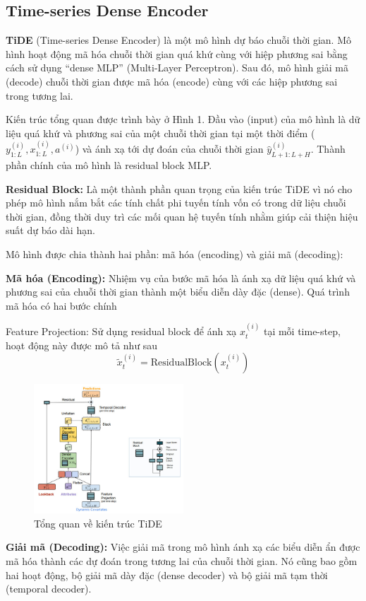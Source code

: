 \subsection{Time-series Dense Encoder}
\textbf{TiDE} (Time-series Dense Encoder) là một mô hình dự báo chuỗi thời gian. Mô hình hoạt động mã hóa chuỗi thời gian quá khứ cùng với hiệp phương sai bằng cách sử dụng “dense MLP” (Multi-Layer Perceptron). Sau đó, mô hình giải mã (decode) chuỗi thời gian được mã hóa (encode) cùng với các hiệp phương sai trong tương lai.

Kiến trúc tổng quan được trình bày ở Hình 1. Đầu vào (input) của mô hình là dữ liệu quá khứ và phương sai của một chuỗi thời gian tại một thời điểm ($y_{1:L}^{(i)}, x_{1:L}^{(i)}, a^{(i)}$) và ánh xạ tới dự đoán của chuỗi thời gian $\hat{y}_{L+1:L+H}^{(i)}$. Thành phần chính của mô hình là residual block MLP.

\textbf{Residual Block:} Là một thành phần quan trọng của kiến trúc TiDE vì nó cho phép mô hình nắm bắt các tính chất phi tuyến tính vốn có trong dữ liệu chuỗi thời gian, đồng thời duy trì các mối quan hệ tuyến tính nhằm giúp cải thiện hiệu suất dự báo dài hạn. 

Mô hình được chia thành hai phần: mã hóa (encoding) và giải mã (decoding):

\textbf{Mã hóa (Encoding):} Nhiệm vụ của bước mã hóa là ánh xạ dữ liệu quá khứ và phương sai của chuỗi thời gian thành một biểu diễn dày đặc (dense). Quá trình mã hóa có hai bước chính

Feature Projection: Sử dụng residual block để ánh xạ $x_t^{(i)}$ tại mỗi time-step, hoạt động này được mô tả như sau
\begin{equation}
    \tilde{x}_t^{(i)} = \text{ResidualBlock}(x_t^{(i)}) 
\end{equation}

\begin{figure}[h]
    \centering
    \includegraphics[width=0.5\textwidth]{img/TiDE.png}
    \caption{Tổng quan về kiến trúc TiDE}
    \label{fig:your_figure_label}
\end{figure}

\textbf{Giải mã (Decoding):} Việc giải mã trong mô hình ánh xạ các biểu diễn ẩn được mã hóa thành các dự đoán trong tương lai của chuỗi thời gian. Nó cũng bao gồm hai hoạt động, bộ giải mã dày đặc (dense decoder) và bộ giải mã tạm thời (temporal decoder).


